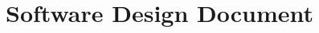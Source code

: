 \documentclass[12pt,a4paper]{article}
\begin{document}


\setcounter{page}{2}








\part{Software Design Document}





\end{document}
